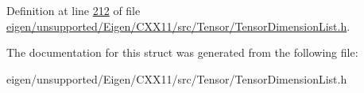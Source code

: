 Definition at line \hyperlink{eigen_2unsupported_2_eigen_2_c_x_x11_2src_2_tensor_2_tensor_dimension_list_8h_source_l00212}{212} of file \hyperlink{eigen_2unsupported_2_eigen_2_c_x_x11_2src_2_tensor_2_tensor_dimension_list_8h_source}{eigen/unsupported/\+Eigen/\+C\+X\+X11/src/\+Tensor/\+Tensor\+Dimension\+List.\+h}.



The documentation for this struct was generated from the following file\+:\begin{DoxyCompactItemize}
\item 
eigen/unsupported/\+Eigen/\+C\+X\+X11/src/\+Tensor/\+Tensor\+Dimension\+List.\+h\end{DoxyCompactItemize}

